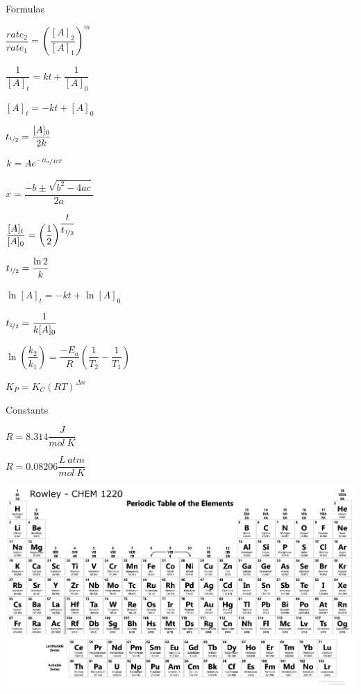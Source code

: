 \documentclass[12pt, letterpaper]{memoir}
\begin{document}
	\pagestyle{empty}
	{\large Formulas}
	
	\begin{minipage}{0.5\linewidth}
		$\dfrac{rate_2}{rate_1}=\left(\dfrac{\left[ A\right]_2}{\left[ A\right]_1}\right)^m$
		
		$\dfrac{1}{[A]_t} = kt + \dfrac{1}{[A]_0}$
		
		$[A]_t=-kt+[A]_0$
		
		$t_{\nicefrac{1}{2}} = \dfrac{[A]_0}{2k}$
		
		$k=Ae^{\nicefrac{-E_a}{RT}}$
		
		$x=\dfrac{-b\pm\sqrt{b^2-4ac}}{2a}$
	\end{minipage}
	\begin{minipage}{0.5\linewidth}
		$\dfrac{[A]_t}{[A]_0}=\left(\dfrac{1}{2}\right)^{\dfrac{t}{t_{\nicefrac{1}{2}}}}$	
		
		$t_{\nicefrac{1}{2}}=\dfrac{\ln{2}}{k}$
		
		$\ln[A]_t=-kt+\ln[A]_0$
		
		$t_{\nicefrac{1}{2}} = \dfrac{1}{k[A]_0}$
			
		$\ln\left(\dfrac{k_2}{k_1}\right)=\dfrac{-E_a}{R}\left(\dfrac{1}{T_2}-\dfrac{1}{T_1}\right)$
		
		$K_P=K_C\left(RT\right)^{\Delta n}$
	\end{minipage}
	
	\vspace{2em}

	{\large Constants}
	
	$R=8.314 \dfrac{J}{mol~K}$
	
	$R=0.08206 \dfrac{L~atm}{mol~K}$
	

	


\hspace{6em}	\includegraphics[width=1.3\textwidth, angle =90]{UpdatedTable}

	\restoregeometry

	
\end{document}
